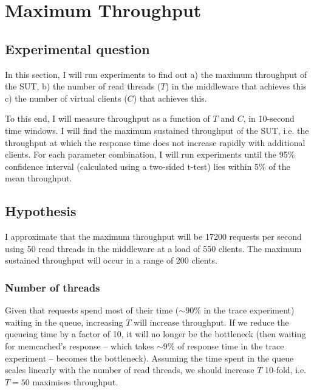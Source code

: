 \documentclass[11pt]{article}
\begin{document}
\clearpage
\section{Maximum Throughput}
\label{sec:exp1}

\subsection{Experimental question}

In this section, I will run experiments to find out a) the maximum throughput of the SUT, b) the number of read threads ($T$) in the middleware that achieves this c) the number of virtual clients ($C$) that achieves this.

To this end, I will measure throughput as a function of $T$ and $C$, in 10-second time windows. I will find the maximum sustained throughput of the SUT, i.e. the throughput at which the response time does not increase rapidly with additional clients. For each parameter combination, I will run experiments until the 95\% confidence interval (calculated using a two-sided t-test) lies within 5\% of the mean throughput.

\subsection{Hypothesis}

I approximate that the maximum throughput will be 17200 requests per second using 50 read threads in the middleware at a load of 550 clients. The maximum sustained throughput will occur in a range of 200 clients.

\subsubsection{Number of threads} 
Given that requests spend most of their time ($\sim90\%$ in the trace experiment) waiting in the queue, increasing $T$ will increase throughput. If we reduce the queueing time by a factor of 10, it will no longer be the bottleneck (then waiting for memcached's response -- which takes $\sim9\%$ of response time in the trace experiment -- becomes the bottleneck). Assuming the time spent in the queue scales linearly with the number of read threads, we should increase $T$ 10-fold, i.e. $T=50$ maximises throughput.
\end{document}
